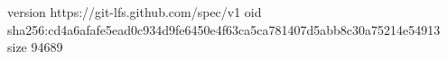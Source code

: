 version https://git-lfs.github.com/spec/v1
oid sha256:cd4a6afafe5ead0c934d9fe6450e4f63ca5ca781407d5abb8c30a75214e54913
size 94689
